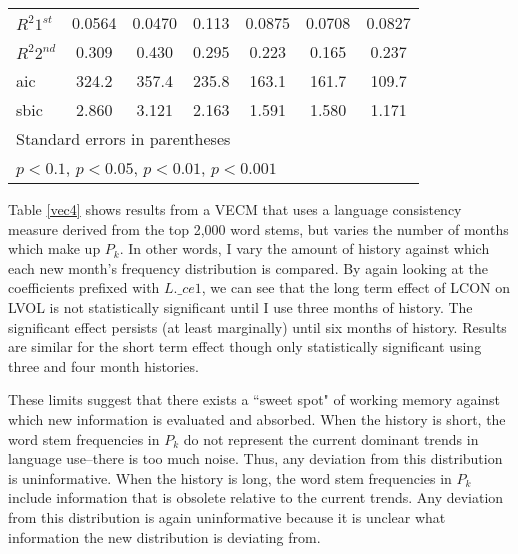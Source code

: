 \begin{table}
\begin{center}
{\begin{tabular}{l*{6}{c}}
$R^2 1^{st}$      &   0.0564         &   0.0470         &    0.113         &   0.0875         &   0.0708         &   0.0827         \\
$R^2 2^{nd}$      &    0.309         &    0.430         &    0.295         &    0.223         &    0.165         &    0.237         \\
aic       &    324.2         &    357.4         &    235.8         &    163.1         &    161.7         &    109.7         \\
sbic      &    2.860         &    3.121         &    2.163         &    1.591         &    1.580         &    1.171         \\
\hline\hline
\multicolumn{7}{l}{\footnotesize Standard errors in parentheses}\\
\multicolumn{7}{l}{\footnotesize \sym{+} \(p<0.1\), \sym{*} \(p<0.05\), \sym{**} \(p<0.01\), \sym{***} \(p<0.001\)}\\
\end{tabular}
}

\end{center}
\end{table}

Table \ref{vec4} shows results from a VECM that uses a language consistency measure derived from the top 2,000 word stems, but varies the number of months which make up $P_k$. In other words, I vary the amount of history against which each new month's frequency distribution is compared. By again looking at the coefficients prefixed with $L.\_ce1$, we can see that the long term effect of LCON on LVOL is not statistically significant until I use three months of history. The significant effect persists (at least marginally) until six months of history. Results are similar for the short term effect though only statistically significant using three and four month histories.

These limits suggest that there exists a ``sweet spot" of working memory against which new information is evaluated and absorbed. When the history is short, the word stem frequencies in $P_k$ do not represent the current dominant trends in language use--there is too much noise. Thus, any deviation from this distribution is uninformative. When the history is long, the word stem frequencies in $P_k$ include information that is obsolete relative to the current trends. Any deviation from this distribution is again uninformative because it is unclear what information the new distribution is deviating from.

